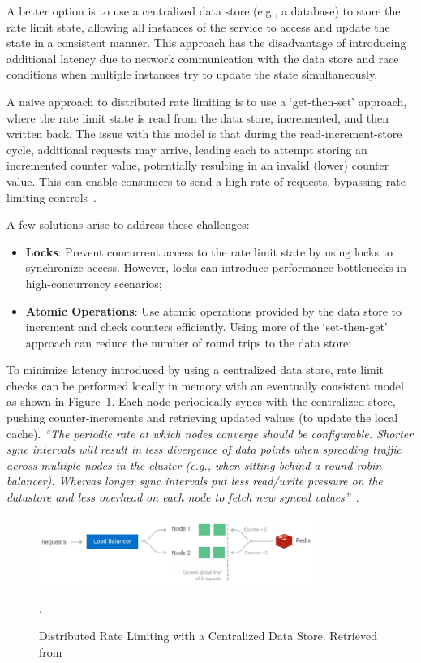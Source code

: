 A better option is to use a centralized data store (e.g., a database) to store the rate limit state,
allowing all instances of the service to access and update the state in a consistent manner.
This approach has the disadvantage
of introducing additional latency due to network communication with the data store and race conditions when
multiple instances try to update the state simultaneously.

A naive approach to distributed rate limiting is to use a `get-then-set' approach,
where the rate limit state is read from the data store, incremented, and then written back.
The issue with this model is that during the read-increment-store cycle, additional requests may arrive, leading each to attempt storing an incremented counter value, potentially resulting in an invalid (lower) counter value. This can enable consumers to send a high rate of requests, bypassing rate limiting controls~\cite{kong-rate-limiting}.

A few solutions arise to address these challenges:

\begin{itemize}
    \item \textbf{Locks}: Prevent concurrent access to the rate limit state by using locks to synchronize access.
    However, locks can introduce performance bottlenecks in high-concurrency scenarios;
    \item \textbf{Atomic Operations}:
    Use atomic operations provided by the data store to increment and check counters efficiently.
    Using more of the `set-then-get' approach can reduce the number of round trips to the data store;
\end{itemize}

To minimize latency introduced by using a centralized data store,
rate limit checks can be performed locally in memory with an eventually consistent model as shown in Figure~\ref{fig:distributed-rate-limiting-centralized}.
Each node periodically syncs with the centralized store,
pushing counter-increments and retrieving updated values (to update the local cache).
\textit{\enquote{The periodic rate at which nodes converge should be configurable. Shorter sync intervals will result in less divergence of data points when spreading traffic across multiple nodes in the cluster (e.g., when sitting behind a round robin balancer). Whereas longer sync intervals put less read/write pressure on the datastore and less overhead on each node to fetch new synced values}}~\cite{kong-rate-limiting}.

\begin{figure}[!htb]
    \centering
    \includegraphics[width=0.8\textwidth]{../figures/06_distributed_rate_limiting}
    \caption{Distributed Rate Limiting with a Centralized Data Store.
    Retrieved from~\cite{kong-rate-limiting}}.
    \label{fig:distributed-rate-limiting-centralized}
\end{figure}

